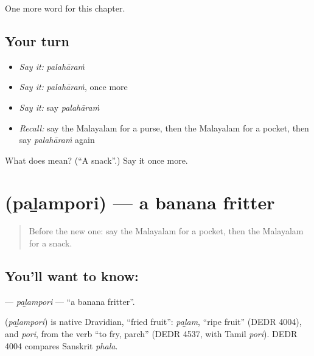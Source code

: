 \begin{grammarlens}[title={What you've built}]
One more word for this chapter.
\end{grammarlens}

\subsection*{Your turn}
\begin{itemize}
\raggedright
  \item \emph{Say it:} \emph{palahāraṁ}
  \item \emph{Say it:} \emph{palahāraṁ}, once more
  \item \emph{Say it:} say \emph{palahāraṁ}
  \item \emph{Recall:} say the Malayalam for a purse, then the Malayalam for a pocket, then say \emph{palahāraṁ} again
\end{itemize}

\begin{tcolorbox}[breakable,colback=teal!4,colframe=teal!35!black,title={Before you move on}]
What does  mean? (\textquotedblleft{}A snack\textquotedblright{}.) Say it once more.
\end{tcolorbox}
\section[\texorpdfstring{\ml{പഴംപൊരി} (paḻampori)}{പഴംപൊരി (paḻampori)}]{ (paḻampori) — a banana fritter}

\label{lesson:ML-C287-palampori}



\begin{quote}
Before the new one: say the Malayalam for a pocket, then the Malayalam for a snack.
\end{quote}

\subsection*{You'll want to know: }
\textbf{} — \emph{paḻampori} — \textquotedblleft{}a banana fritter\textquotedblright{}.

\begin{cousinweb}
\textbf{} (\emph{paḻampori}) is native Dravidian, \textquotedblleft{}fried fruit\textquotedblright{}: \emph{paḻam}, \textquotedblleft{}ripe fruit\textquotedblright{} (DEDR 4004), and \emph{pori}, from the verb \textquotedblleft{}to fry, parch\textquotedblright{} (DEDR 4537, with Tamil \emph{pori}). DEDR 4004 compares Sanskrit \emph{phala}.
\end{cousinweb}


